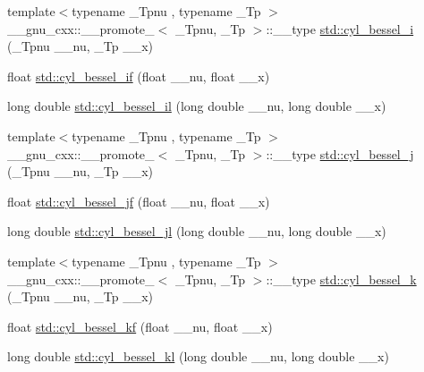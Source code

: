 \begin{DoxyCompactItemize}
\item 
{\footnotesize template$<$typename \+\_\+\+Tpnu , typename \+\_\+\+Tp $>$ }\\\+\_\+\+\_\+gnu\+\_\+cxx\+::\+\_\+\+\_\+promote\+\_$<$ \+\_\+\+Tpnu, \+\_\+\+Tp $>$\+::\+\_\+\+\_\+type \hyperlink{group__tr29124__math__spec__func_ga1c9b5a5c36f000a4f0a55f7fcc486cb0}{std\+::cyl\+\_\+bessel\+\_\+i} (\+\_\+\+Tpnu \+\_\+\+\_\+nu, \+\_\+\+Tp \+\_\+\+\_\+x)
\item 
float \hyperlink{group__tr29124__math__spec__func_gaaf738427d4da0bda66bc2274dfb853a7}{std\+::cyl\+\_\+bessel\+\_\+if} (float \+\_\+\+\_\+nu, float \+\_\+\+\_\+x)
\item 
long double \hyperlink{group__tr29124__math__spec__func_gab7962629216d03efb8ecaa3f70c6878f}{std\+::cyl\+\_\+bessel\+\_\+il} (long double \+\_\+\+\_\+nu, long double \+\_\+\+\_\+x)
\item 
{\footnotesize template$<$typename \+\_\+\+Tpnu , typename \+\_\+\+Tp $>$ }\\\+\_\+\+\_\+gnu\+\_\+cxx\+::\+\_\+\+\_\+promote\+\_$<$ \+\_\+\+Tpnu, \+\_\+\+Tp $>$\+::\+\_\+\+\_\+type \hyperlink{group__tr29124__math__spec__func_ga47e21a13b6d68d0d7f057699bd3b3ce0}{std\+::cyl\+\_\+bessel\+\_\+j} (\+\_\+\+Tpnu \+\_\+\+\_\+nu, \+\_\+\+Tp \+\_\+\+\_\+x)
\item 
float \hyperlink{group__tr29124__math__spec__func_ga15731a7bccd6351d28353e3c4c2a2d23}{std\+::cyl\+\_\+bessel\+\_\+jf} (float \+\_\+\+\_\+nu, float \+\_\+\+\_\+x)
\item 
long double \hyperlink{group__tr29124__math__spec__func_gade8e94a80520a8b628b2d658755b25c0}{std\+::cyl\+\_\+bessel\+\_\+jl} (long double \+\_\+\+\_\+nu, long double \+\_\+\+\_\+x)
\item 
{\footnotesize template$<$typename \+\_\+\+Tpnu , typename \+\_\+\+Tp $>$ }\\\+\_\+\+\_\+gnu\+\_\+cxx\+::\+\_\+\+\_\+promote\+\_$<$ \+\_\+\+Tpnu, \+\_\+\+Tp $>$\+::\+\_\+\+\_\+type \hyperlink{group__tr29124__math__spec__func_ga76dcd3884620955680112aca0d327ada}{std\+::cyl\+\_\+bessel\+\_\+k} (\+\_\+\+Tpnu \+\_\+\+\_\+nu, \+\_\+\+Tp \+\_\+\+\_\+x)
\item 
float \hyperlink{group__tr29124__math__spec__func_ga1f50047f9aab0ec8b1a1615fe9fbe32f}{std\+::cyl\+\_\+bessel\+\_\+kf} (float \+\_\+\+\_\+nu, float \+\_\+\+\_\+x)
\item 
long double \hyperlink{group__tr29124__math__spec__func_gac35194b926270d7857d651e06198c7d3}{std\+::cyl\+\_\+bessel\+\_\+kl} (long double \+\_\+\+\_\+nu, long double \+\_\+\+\_\+x)

\end{DoxyCompactItemize}
